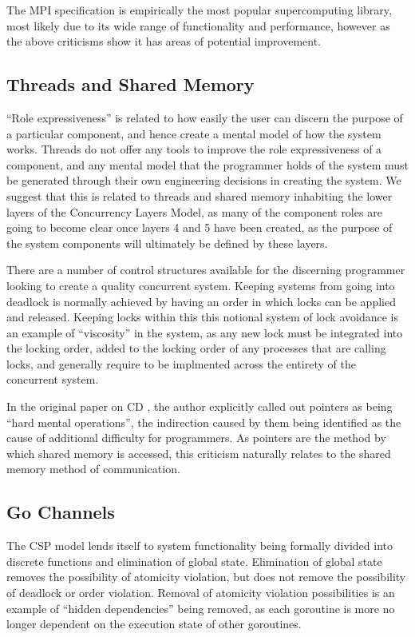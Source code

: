 \documentclass{sig-alternate}
\begin{document}
The MPI specification is empirically the most popular supercomputing library, most likely due to its wide range of functionality and performance, however as the above criticisms show it has areas of potential improvement. 

\subsection{Threads and Shared Memory}
``Role expressiveness'' is related to how easily the user can discern the purpose of a particular component, and hence create a mental model of how the system works. Threads do not offer any tools to improve the role expressiveness of a component, and any mental model that the programmer holds of the system must be generated through their own engineering decisions in creating the system. We suggest that this is related to threads and shared memory inhabiting the lower layers of the Concurrency Layers Model, as many of the component roles are going to become clear once layers 4 and 5 have been created, as the purpose of the system components will ultimately be defined by these layers.

There are a number of control structures available for the discerning programmer looking to create a quality concurrent system. Keeping systems from going into deadlock is normally achieved by having an order in which locks can be applied and released. Keeping locks within this this notional system of lock avoidance is an example of ``viscosity'' in the system, as any new lock must be integrated into the locking order, added to the locking order of any processes that are calling locks, and generally require to be implmented across the entirety of the concurrent system.

In the original paper on CD \cite{enpl}, the author explicitly called out pointers as being ``hard mental operations'', the indirection caused by them being identified as the cause of additional difficulty for programmers. As pointers are the method by which shared memory is accessed, this criticism naturally relates to the shared memory method of communication. 

\subsection{Go Channels}
The CSP model lends itself to system functionality being formally divided into discrete functions and elimination of global state. Elimination of global state removes the possibility of atomicity violation, but does not remove the possibility of deadlock or order violation. Removal of atomicity violation possibilities is an example of ``hidden dependencies'' being removed, as each goroutine is more no longer dependent on the execution state of other goroutines.
\end{document}
